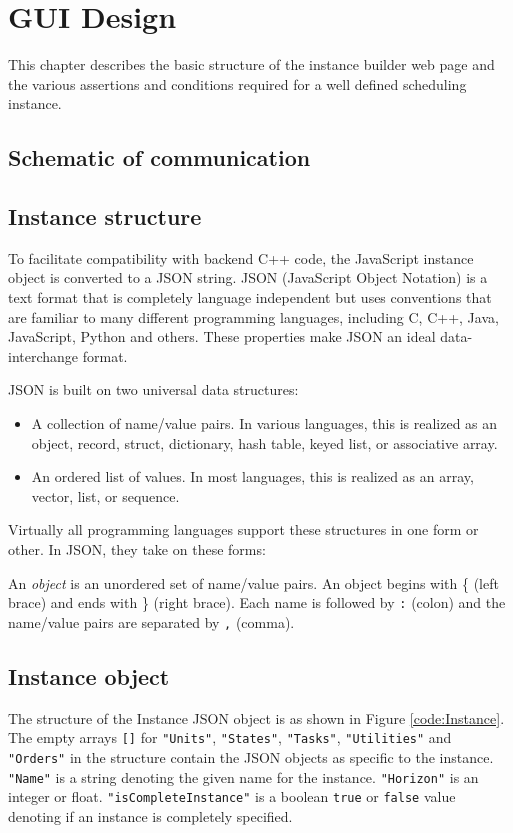 \chapter{GUI Design}
\thispagestyle{plain}

This chapter describes the basic structure of the instance builder web page and the various assertions and conditions required for a well defined scheduling instance.

\section{Schematic of communication}

\section{Instance structure}
To facilitate compatibility with backend C++ code, the JavaScript instance object is converted to a JSON string. JSON (JavaScript Object Notation) is a text format that is completely language independent but uses conventions that are familiar to many different programming languages, including C, C++, Java, JavaScript, Python and others. These properties make JSON an ideal data-interchange format.

JSON is built on two universal data structures:
\begin{itemize}
\item A collection of name/value pairs. In various languages, this is realized as an object, record, struct, dictionary, hash table, keyed list, or associative array.
\item An ordered list of values. In most languages, this is realized as an array, vector, list, or sequence.
\end{itemize}
Virtually all programming languages support these structures in one form or other. In JSON, they take on these forms:

An \emph{object} is an unordered set of name/value pairs. An object begins with \{ (left brace) and ends with \}  (right brace). Each name is followed by \lstinline{:} (colon) and the name/value pairs are separated by \lstinline{,} (comma).
\section{Instance object}
\setlength{\abovedisplayskip}{1pt}
\setlength{\belowdisplayskip}{1pt}
The structure of the Instance JSON object is as shown in Figure \ref{code:Instance}. The empty arrays \lstinline{[]} for \lstinline{"Units"}, \lstinline{"States"}, \lstinline{"Tasks"}, \lstinline{"Utilities"} and \lstinline{"Orders"} in the structure contain the JSON objects as specific to the instance. \lstinline{"Name"} is a string denoting the given name for the instance. \lstinline{"Horizon"} is an integer or float. \lstinline{"isCompleteInstance"} is a boolean \lstinline{true} or \lstinline{false} value denoting if an instance is completely specified.


